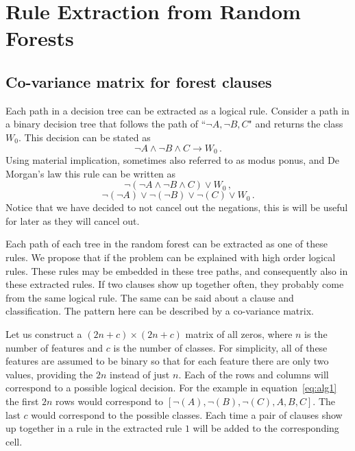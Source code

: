 \documentclass[11pt]{article}
\begin{document}
\section{Rule Extraction from Random Forests}
\label{sec:alg}
\subsection{Co-variance matrix for forest clauses}
Each path in a decision tree can be extracted as a logical rule. Consider a path in a binary decision tree that follows the path of ``$\neg A, \neg B, C$" and returns the class $W_0$. This decision can be stated as 
\[\neg A \land \neg B \land C \rightarrow W_0 \,.\]
Using material implication, sometimes also referred to as modus ponus, and De Morgan's law this rule can be written as 
\[\neg\left(\neg A \land \neg B \land C\right) \lor W_0 \, , \]
\begin{equation}
\neg(\neg A) \lor \neg (\neg B) \lor \neg(C) \lor W_0 \, .
\label{eq:alg1}
\end{equation}
Notice that we have decided to not cancel out the negations, this is will be useful for later as they will cancel out. 

Each path of each tree in the random forest can be extracted as one of these rules. We propose that if the problem can be explained with high order logical rules. These rules may be embedded in these tree paths, and consequently also in these extracted rules. If two clauses show up together often, they probably come from the same logical rule. The same can be said about a clause and classification. The pattern here can be described by a co-variance matrix. 

Let us construct a $(2n +c) \times (2n+c)$ matrix of all zeros, where $n$ is the number of features and $c$ is the number of classes. For simplicity, all of these features are assumed to be binary so that for each feature there are only two values, providing the $2n$ instead of just $n$. Each of the rows and columns will correspond to a possible logical decision. For the example in equation~\ref{eq:alg1} the first $2n$ rows would correspond to $[\neg(A), \neg(B), \neg(C), A, B, C]$. The last $c$ would correspond to the possible classes. Each time a pair of clauses show up together in a rule in the extracted rule $1$ will be added to the corresponding cell. 
\end{document}

